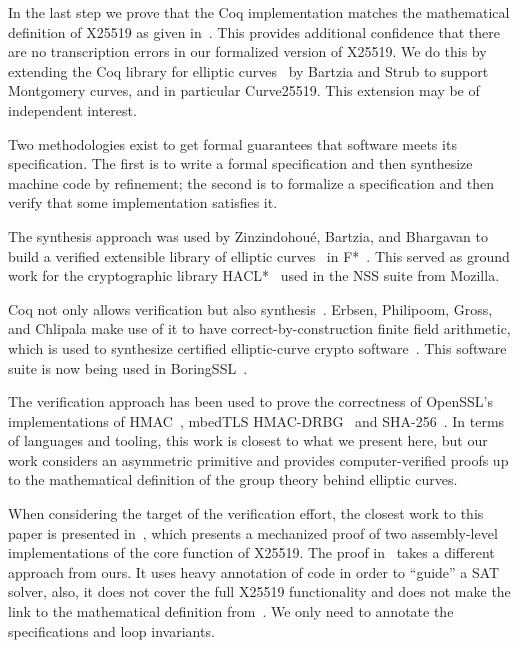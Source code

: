 In the last step we prove that the Coq implementation matches
the mathematical definition of X25519 as given in~\cite[Sec.~2]{Ber06}.
This provides additional confidence that there are no transcription errors
in our formalized version of X25519.
We do this by extending the Coq library
for elliptic curves~\cite{BartziaS14} by Bartzia and Strub to
support Montgomery curves, and in particular Curve25519.
This extension may be of independent interest.

Two methodologies exist to get formal guarantees that software meets its specification.
The first is to write a formal specification and then synthesize
machine code by refinement; the second is to formalize
a specification and then verify that some
implementation satisfies it.

The synthesis approach was used by Zinzindohou{\'{e}}, Bartzia, and Bhargavan to build a verified extensible
library of elliptic curves~\cite{Zinzindohoue2016AVE} in F*~\cite{DBLP:journals/corr/BhargavanDFHPRR17}.
This served as ground work for the cryptographic library HACL*~\cite{zinzindohoue2017hacl}
used in the NSS suite from Mozilla.

Coq not only allows verification but also synthesis~\cite{CpdtJFR}.
Erbsen, Philipoom, Gross, and Chlipala make use of it to have
correct-by-construction finite field arithmetic, which is used
to synthesize certified elliptic-curve crypto software~\cite{Philipoom2018CorrectbyconstructionFF,Erbsen2017CraftingCE,Erbsen2016SystematicSO}.
This software suite is now being used in BoringSSL~\cite{fiat-crypto}.

The verification approach has been used to prove the correctness of OpenSSL's
implementations of HMAC~\cite{Beringer2015VerifiedCA}, mbedTLS HMAC-DRBG~\cite{2017-Ye} and SHA-256~\cite{2015-Appel}.
In terms of languages and tooling, this work is closest to what we present here,
but our work considers an asymmetric primitive and provides computer-verified
proofs up to the mathematical definition of the group theory behind elliptic curves.

When considering the target of the verification effort, the closest work
to this paper is presented in~\cite{Chen2014VerifyingCS}, which presents
a mechanized proof of two assembly-level implementations of the core function
of X25519.
The proof in~\cite{Chen2014VerifyingCS} takes a different approach from ours.
It uses heavy annotation of code in order to ``guide'' a SAT solver,
also, it does not cover the full X25519 functionality and does
not make the link to the mathematical definition from~\cite{Ber06}.
We only need to annotate the specifications and loop invariants.

